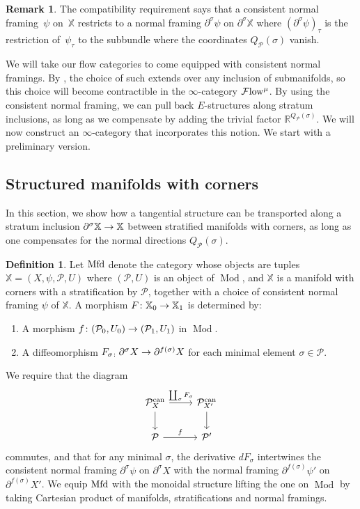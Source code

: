 \documentclass[10pt]{amsart}
\numberwithin{equation}{section}
\theoremstyle{definition}
\newtheorem{definition}[prop]{Definition}
\newtheorem{rem}[prop]{Remark}
\DeclareMathOperator{\Mod}{Mod}
\DeclareMathOperator{\can}{can}
\newcommand{\Flow}{\cF\mathrm{low}\vphantom{w}}
\newcommand{\Mfd}{\mathrm{Mfd}\vphantom{d}}
\newcommand{\bR}{\mathbb{R}}
\newcommand{\bX}{\mathbb{X}}
\newcommand{\cP}{\mathcal{P}}
\newcommand{\cF}{\mathcal{F}}
\newcommand{\del}{\partial}
\renewcommand{\to}{\mathchoice{\longrightarrow}{\rightarrow}{}{}}
\begin{document}
\begin{rem}
	The compatibility requirement says that a consistent normal framing~$\psi$ on~$\bX$ restricts to a normal framing $\del^{\sigma} \psi$ on $\del^{\sigma}\bX$ where $(\del^{\sigma}\psi)_{\tau}$ is the restriction of~$\psi_{\tau}$ to the subbundle where the coordinates $Q_{\cP}(\sigma)$ vanish.
\end{rem}

We will take our flow categories to come equipped with consistent normal framings.
By \cite[Lemma 2.26]{AB}, the choice of such extends over any inclusion of submanifolds, so this choice will become contractible in the $\infty$-category $\Flow^{\mu}$.
By using the consistent normal framing, we can pull back $E$-structures along stratum inclusions, as long as we compensate by adding the trivial factor $\bR^{Q_{\cP}(\sigma)}$.
We will now construct an $\infty$-category that incorporates this notion.
We start with a preliminary version.




\subsection{Structured manifolds with corners}\label{subsec:structured_manifolds}
In this section, we show how a tangential structure can be transported along a stratum inclusion $\del^{\sigma}\bX \to \bX$ between stratified manifolds with corners, as long as one compensates for the normal directions $Q_{\cP}(\sigma)$.

\begin{definition}\label{def:PreMfd}
	Let $\Mfd$ denote the category whose objects are tuples $\bX = (X,\psi,\cP,U)$ where $(\cP,U)$ is an object of $\Mod$, and $\bX$ is a manifold with corners with a stratification by $\cP$, together with a choice of consistent normal framing $\psi$ of $\bX$.
  A morphism $F\colon \bX_{0} \to \bX_{1}$ is determined by:
	\begin{enumerate}
		\item A morphism $f\colon (\cP_{0},U_{0}) \to (\cP_{1},U_{1})$ in $\Mod$.
		\item A diffeomorphism $F_{\sigma \colon} \del^{\sigma}X \to \del^{f(\sigma)}X$ for each minimal element $\sigma \in \cP$.
	\end{enumerate}
	We require that the diagram
	\begin{equation*}
		\begin{tikzcd}
			\cP^{\can}_{X} \arrow[r, "\coprod_{\sigma} F_{\sigma}"] \arrow[d]      &    \cP^{\can}_{X'} \arrow[d] \\
			\cP \arrow[r,"f"]                &  \cP'
		\end{tikzcd}
	\end{equation*}
	commutes, and that for any minimal $\sigma$, the derivative $dF_{\sigma}$ intertwines the consistent normal framing $\del^{\sigma}\psi$ on $\del^{\sigma}X$ with the normal framing $\del^{f(\sigma)}\psi'$ on $\del^{f(\sigma)}X'$.
	We equip $\Mfd$ with the monoidal structure lifting the one on $\Mod$ by taking Cartesian product of manifolds, stratifications and normal framings.
\end{definition}
\end{document}
